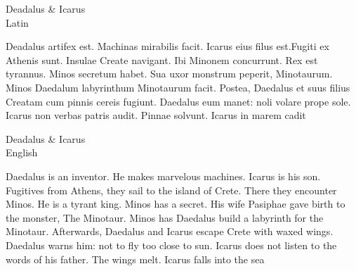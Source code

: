 \begin{center}
  \huge Deadalus \& Icarus \\ 
  \huge Latin
\end{center}
Deadalus artifex est. Machinas mirabilis facit. Icarus eius filus
est.Fugiti ex Athenis sunt. Insulae Create navigant. Ibi Minonem concurrunt.
Rex est tyrannus. Minos secretum habet. Sua uxor monstrum peperit, Minotaurum.
Minos Daedalum labyrinthum Minotaurum facit. Postea, Daedalus et suus
filius Creatam cum pinnis cereis fugiunt. Daedalus eum manet: noli
volare prope sole. Icarus non verbas patris audit. Pinnae solvunt.
Icarus in marem cadit
\begin{center}
  \huge Deadalus \& Icarus \\ 
  \huge English
\end{center}
Daedalus is an inventor. He makes marvelous machines. Icarus is his son.
Fugitives from Athens, they sail to the island of Crete. There
they encounter Minos. He is a tyrant king. Minos has a secret. His
wife Pasiphae gave birth to the monster, The Minotaur. Minos has
Daedalus build a labyrinth for the Minotaur. Afterwards, Daedalus and Icarus
escape Crete with waxed wings. Daedalus warns him: not to fly too
close to sun. Icarus does not listen to the words of his father. 
The wings melt. Icarus falls into the sea

